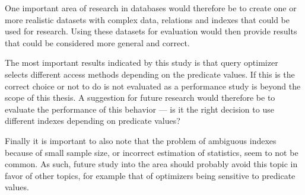 One important area of research in databases would therefore be to create one or
more realistic datasets with complex data, relations and indexes that could be
used for research. Using these datasets for evaluation would then provide
results that could be considered more general and correct.

The most important results indicated by this study is that query optimizer
selects different access methods depending on the predicate values. If this
is the correct choice or not to do is not evaluated as a performance study is
beyond the scope of this thesis. A suggestion for future research would
therefore be to evaluate the performance of this behavior --- is it the right
decision to use different indexes depending on predicate values?

Finally it is important to also note that the problem of ambiguous indexes
because of small sample size, or incorrect estimation of statistics, seem to not
be common. As such, future study into the area should probably avoid this topic
in favor of other topics, for example that of optimizers being sensitive to
predicate values.